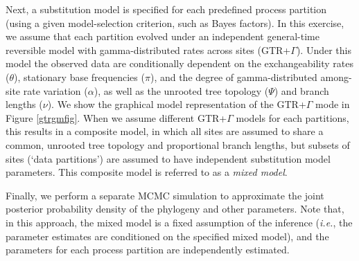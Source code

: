 Next, a substitution model is specified for each predefined process partition (using a given model-selection criterion, such as Bayes factors).
In this exercise, we assume that each partition evolved under an independent general-time reversible model with gamma-distributed rates across sites (GTR+$\Gamma$). 
Under this model the observed data are conditionally dependent on the exchangeability rates ($\theta$), stationary base frequencies ($\pi$), and the degree of gamma-distributed among-site rate variation ($\alpha$), as well as the unrooted tree topology ($\Psi$) and branch lengths ($\nu$).
We show the graphical model representation of the GTR+$\Gamma$ mode in Figure \ref{gtrgmfig}. 
When we assume different GTR+$\Gamma$ models for each partitions, this results in a composite model, in which all sites are assumed to share a common, unrooted tree topology and proportional branch lengths, but subsets of sites (`data partitions') are assumed to have independent substitution model parameters.
This composite model is referred to as a \emph{mixed model}. %



Finally, we perform a separate MCMC simulation to approximate the joint posterior probability density of the phylogeny and other parameters.  Note that, in this approach, the mixed model is a fixed assumption of the inference ({\it i.e.}, the parameter estimates are conditioned on the specified mixed model), and the parameters for each process partition are independently estimated.

